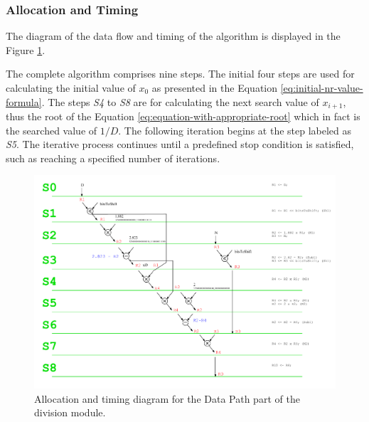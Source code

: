 \documentclass[a4paper, twoside, 11pt]{article}
\newcommand{\fbar}{\FloatBarrier}
\begin{document}
\subsubsection{Allocation and Timing}\label{subsubsec:division-allocation-and-timing}
The diagram of the data flow and timing of the algorithm is displayed in the Figure \ref{fig:division-allocation-timing}.\par
The complete algorithm comprises nine steps. The initial four steps are used for calculating the initial value of $x_0$ as presented in the Equation \ref{eq:initial-nr-value-formula}. The steps \textit{S4} to \textit{S8} are for calculating the next search value of $x_{i+1}$, thus the root of the Equation \ref{eq:equation-with-appropriate-root} which in fact is the searched value of $1/D$. The following iteration begins at the step labeled as \textit{S5}. The iterative process continues until a predefined stop condition is satisfied, such as reaching a specified number of iterations.
\begin{figure}[htbp!]
  \centering
  \includegraphics[width=1\textwidth]{src/pdf/allocation-timing.pdf}
   \caption{Allocation and timing diagram for the Data Path part of the division module.}
  \label{fig:division-allocation-timing}
\end{figure}

\fbar
\end{document}

